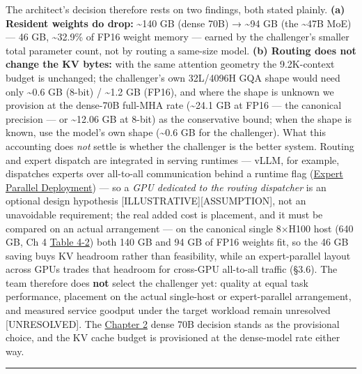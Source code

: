The architect's decision therefore rests on two findings, both stated
plainly. \textbf{(a) Resident weights do drop:} \textasciitilde140 GB
(dense 70B) → \textasciitilde94 GB (the \textasciitilde47B MoE) --- 46
GB, \textasciitilde32.9\% of FP16 weight memory --- earned by the
challenger's smaller total parameter count, not by routing a same-size
model. \textbf{(b) Routing does not change the KV bytes:} with the same
attention geometry the 9.2K-context budget is unchanged; the
challenger's own 32L/4096H GQA shape would need only \textasciitilde0.6
GB (8-bit) / \textasciitilde1.2 GB (FP16), and where the shape is
unknown we provision at the dense-70B full-MHA rate (\textasciitilde24.1
GB at FP16 --- the canonical precision --- or \textasciitilde12.06 GB at
8-bit) as the conservative bound; when the shape is known, use the
model's own shape (\textasciitilde0.6 GB for the challenger). What this
accounting does \emph{not} settle is whether the challenger is the
better system. Routing and expert dispatch are integrated in serving
runtimes --- vLLM, for example, dispatches experts over all-to-all
communication behind a runtime flag
(\href{https://docs.vllm.ai/en/latest/serving/expert_parallel_deployment/}{Expert
Parallel Deployment}) --- so a \emph{GPU dedicated to the routing
dispatcher} is an optional design hypothesis
\mbox{{[}ILLUSTRATIVE{]}}\hspace{0pt}\mbox{{[}ASSUMPTION{]}}, not an unavoidable requirement; the
real added cost is placement, and it must be compared on an actual
arrangement --- on the canonical single 8×H100 host (640 GB, Ch 4 \hyperref[tab:4.2]{Table 4-2}) both 140 GB and 94 GB of FP16 weights fit, so the 46 GB saving buys
KV headroom rather than feasibility, while an expert-parallel layout
across GPUs trades that headroom for cross-GPU all-to-all traffic
(§3.6). The team therefore does \textbf{not} select the challenger yet:
quality at equal task performance, placement on the actual single-host
or expert-parallel arrangement, and measured service goodput under the
target workload remain unresolved \mbox{{[}UNRESOLVED{]}}. The \hyperref[chap:2]{Chapter 2} dense
70B decision stands as the provisional choice, and the KV cache budget
is provisioned at the dense-model rate either way.

\begin{center}\rule{0.5\linewidth}{0.5pt}\end{center}

